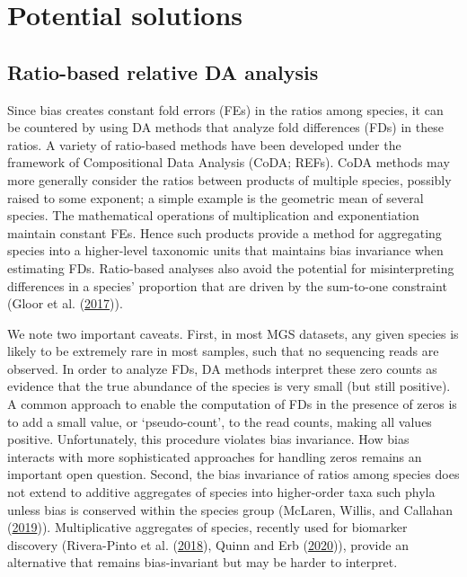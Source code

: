 \documentclass[
]{article}
\begin{document}
\hypertarget{solutions}{%
\section{Potential solutions}\label{solutions}}

\hypertarget{ratio-based-relative-da-analysis}{%
\subsection{Ratio-based relative DA analysis}\label{ratio-based-relative-da-analysis}}

Since bias creates constant fold errors (FEs) in the ratios among species, it can be countered by using DA methods that analyze fold differences (FDs) in these ratios.
A variety of ratio-based methods have been developed under the framework of Compositional Data Analysis (CoDA; REFs).
CoDA methods may more generally consider the ratios between products of multiple species, possibly raised to some exponent; a simple example is the geometric mean of several species.
The mathematical operations of multiplication and exponentiation maintain constant FEs.
Hence such products provide a method for aggregating species into a higher-level taxonomic units that maintains bias invariance when estimating FDs.
Ratio-based analyses also avoid the potential for misinterpreting differences in a species' proportion that are driven by the sum-to-one constraint (Gloor et al. (\protect\hyperlink{ref-gloor2017micr}{2017})).

We note two important caveats.
First, in most MGS datasets, any given species is likely to be extremely rare in most samples, such that no sequencing reads are observed.
In order to analyze FDs, DA methods interpret these zero counts as evidence that the true abundance of the species is very small (but still positive).
A common approach to enable the computation of FDs in the presence of zeros is to add a small value, or `pseudo-count', to the read counts, making all values positive.
Unfortunately, this procedure violates bias invariance.
How bias interacts with more sophisticated approaches for handling zeros remains an important open question.
Second, the bias invariance of ratios among species does not extend to additive aggregates of species into higher-order taxa such phyla unless bias is conserved within the species group (McLaren, Willis, and Callahan (\protect\hyperlink{ref-mclaren2019cons}{2019})).
Multiplicative aggregates of species, recently used for biomarker discovery (Rivera-Pinto et al. (\protect\hyperlink{ref-riverapinto2018bala}{2018}), Quinn and Erb (\protect\hyperlink{ref-quinn2020inte}{2020})), provide an alternative that remains bias-invariant but may be harder to interpret.
\end{document}
